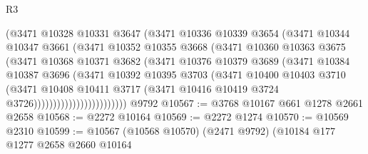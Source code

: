 \begin{lexlean}{R3}
\begin{coremodule}
                            (@3471
                              @10328
                              @10331
                              @3647
                              (@3471
                                @10336
                                @10339
                                @3654
                                (@3471
                                  @10344
                                  @10347
                                  @3661
                                  (@3471
                                    @10352
                                    @10355
                                    @3668
                                    (@3471
                                      @10360
                                      @10363
                                      @3675
                                      (@3471
                                        @10368
                                        @10371
                                        @3682
                                        (@3471
                                          @10376
                                          @10379
                                          @3689
                                          (@3471
                                            @10384
                                            @10387
                                            @3696
                                            (@3471
                                              @10392
                                              @10395
                                              @3703
                                              (@3471
                                                @10400
                                                @10403
                                                @3710
                                                (@3471
                                                  @10408
                                                  @10411
                                                  @3717
                                                  (@3471
                                                    @10416
                                                    @10419
                                                    @3724
                                                    @3726))))))))))))))))))))))))
    @9792
@10567 := @3768 @10167 @661 @1278 @2661 @2658
@10568 := @2272 @10164
@10569 := @2272 @1274
@10570 := @10569 @2310
@10599 := @10567
    (@10568 @10570)
    (@2471 @9792)
    (@10184
      @177
      @1277
      @2658
      @2660
      @10164

\end{coremodule}
\end{lexlean}
